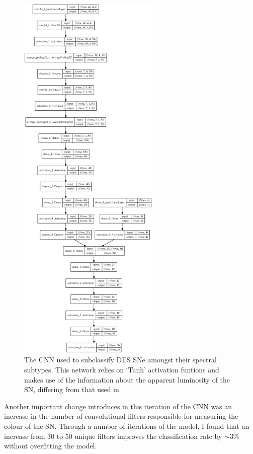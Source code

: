 \begin{figure}
  \centering
  \includegraphics[width=0.6\textwidth]{Figures/Chapter5/SN}
  \caption{The CNN used to subclassify DES SNe amongst their spectral subtypes. This network relies on `Tanh' activation funtions and makes use of the information about the apparent luminosity of the SN, differing from that used in }
  \label{fig:SNClassificationNetwork}
\end{figure}

Another important change introduces in this iteration of the CNN was an increase in the number of convolutional filters responsible for measuring the colour of the SN. Through a number of iterations of the model, I found that an increase from 30 to 50 unique filters improves the classification rate by $\sim$3\% without overfitting the model.

